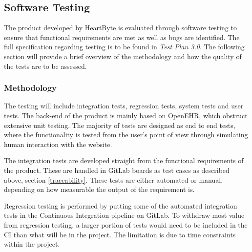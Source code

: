 \documentclass{article}
\begin{document}
	\subsection{Software Testing}
	The product developed by HeartByte is evaluated through software testing to ensure that functional requirements are met as well as bugs are identified. The full specification regarding testing is to be found in \textit{Test Plan 3.0}. The following section will provide a brief overview of the methodology and how the quality of the tests are to be assessed.
	
	\begin{comment}
		Dynamic testing - What TEsting team does
		Static testing - What I do
		Detect overcomplecity in code, find security errors (help source code be more secured when being deployed), enforce best coding practices (specific to code language, helps other understand code), can create project specific rules
		
		technical dept - translates as the implied cost for additional rework that can occur if at an early stage an easy but not efficient solution is chosen. In the future the easy code may restrict scalability. Might be measured by static testing tool
		
		sonarqube open source static analysis tools. 
		can detect tricky issues: bugs, code smells, security vulnerability,acticate rules needed (quality profiles),
	\end{comment}
	  
	\subsubsection{Methodology}
	The testing will include integration tests, regression tests, system tests and user tests. The back-end of the product is mainly based on OpenEHR, which obstruct extensive unit testing. The majority of tests are designed as end to end tests, where the functionality is tested from the user's point of view through simulating human interaction with the website. 
	
	The integration tests are developed straight from the functional requirements of the product. These are handled in GitLab boards as test cases as described above, section \ref{traceability}. These tests are either automated or manual, depending on how measurable the output of the requirement is.
	
	Regression testing is performed by putting some of the automated integration tests in the Continuous Integration pipeline on GitLab. To withdraw most value from regression testing, a larger portion of tests would need to be included in the CI than what will be in the project. The limitation is due to time constraints within the project.
	
\end{document}
